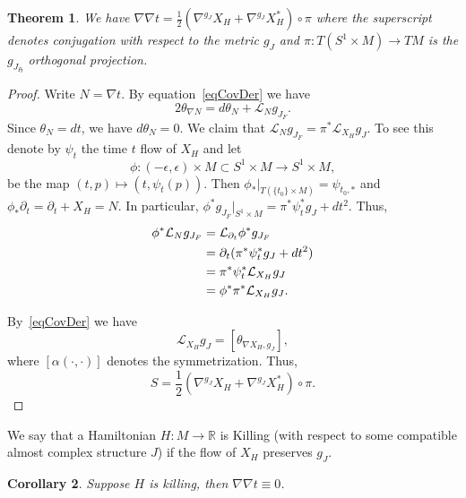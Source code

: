 \documentclass[11pt]{amsart}
\newcommand{\R}{\mathbb{R}}
\newtheorem{tm}{Theorem}[section]
\newtheorem{cy}[tm]{Corollary}
\theoremstyle{definition}
\theoremstyle{remark}
\begin{document}
\begin{tm}\label{tmCurvXH}
 We have $\nabla\nabla t=\frac12(\nabla^{g_J} X_H+\nabla^{g_J} X_H^*)\circ\pi$ where the superscript denotes conjugation with respect to the metric $g_J$ and $\pi:T(S^1\times M)\to TM$ is the $g_{J_{\mathfrak{H}}}$ orthogonal projection.
\end{tm}
\begin{proof}
Write $N=\nabla t$. By equation~\eqref{eqCovDer} we have
\[
2\theta_{\nabla N}=d\theta_{ N}+\mathcal{L}_{ N}g_{J_F}.
\]
Since $\theta_ N=dt$, we have $d\theta_{ N}=0$. We claim that $\mathcal{L}_Ng_{J_F}=\pi^*\mathcal{L}_{X_H}g_J$. To see this denote by $\psi_t$ the time $t$ flow of $X_H$ and let
\[
\phi:(-\epsilon,\epsilon)\times M \subset S^1\times M\to S^1\times M,
\]
be the map $(t,p)\mapsto (t,\psi_{t}(p))$. Then $\phi_*|_{T(\{t_0\}\times M)}=\psi_{t_0,*}$ and $\phi_*\partial_t=\partial_t+X_H=N$. In particular, $\phi^*g_{J_F}|_{S^1\times M}=\pi^*\psi^*_tg_J+dt^2$. Thus,
\begin{align}
\phi^*\mathcal{L}_{ N}g_{J_F}&=\mathcal{L}_{\partial_t}\phi^*g_{J_F\emph{}}\notag\\
&=\partial_t(\pi^*\psi^*_tg_J+dt^2)\notag\\
&=\pi^*\psi_t^*\mathcal{L}_{X_H}g_J\notag\\
&=\phi^*\pi^*\mathcal{L}_{X_H}g_J.
\end{align}

By~\eqref{eqCovDer} we have
\[
\mathcal{L}_{X_H}g_J=[\theta_{\nabla X_H,g_J}],
\]
where $[\alpha(\cdot,\cdot)]$ denotes the symmetrization. Thus,
\[
S=\frac12(\nabla^{g_J} X_H+\nabla^{g_J} X_H^*)\circ\pi.
\]

\end{proof}
We say that a Hamiltonian $H:M\to\R$ is Killing (with respect to some compatible almost complex structure $J$) if the flow of $X_H$ preserves $g_J$.
\begin{cy}\label{cyKilling}
Suppose $H$ is killing, then $\nabla\nabla t\equiv 0$.
\end{cy}
\end{document}
